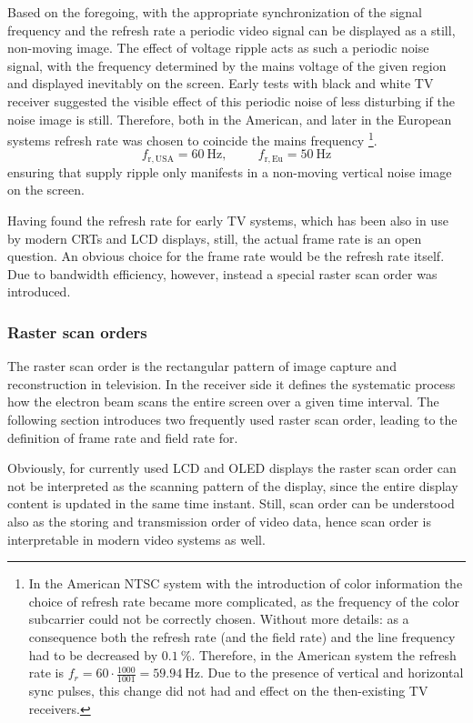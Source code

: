 %
Based on the foregoing, with the appropriate synchronization of the signal frequency and the refresh rate a periodic video signal can be displayed as a still, non-moving image.
The effect of voltage ripple acts as such a periodic noise signal, with the frequency determined by the mains voltage of the given region and displayed inevitably on the screen.
Early tests with black and white TV receiver suggested the visible effect of this periodic noise of less disturbing if the noise image is still.
Therefore, both in the American, and later in the European systems refresh rate was chosen to coincide the mains frequency
\footnote{
In the American NTSC system with the introduction of color information the choice of refresh rate became more complicated, as the frequency of the color subcarrier could not be correctly chosen.
Without more details: as a consequence both the refresh rate (and the field rate) and the line frequency had to be decreased by $0.1~\%$.
Therefore, in the American system the refresh rate is $f_r = 60\cdot \frac{1000}{1001} = 59.94~\mathrm{Hz}$.
Due to the presence of vertical and horizontal sync pulses, this change did not had and effect on the then-existing TV receivers.}.
\begin{equation}
f_{\mathrm{r,USA}} = 60~\mathrm{Hz}, \hspace{1cm} f_{\mathrm{r,Eu}} = 50~\mathrm{Hz}
\end{equation}
ensuring that supply ripple only manifests in a non-moving vertical noise image on the screen.

Having found the refresh rate for early TV systems, which has been also in use by modern CRTs and LCD displays, still, the actual frame rate is an open question.
An obvious choice for the frame rate would be the refresh rate itself.
Due to bandwidth efficiency, however, instead a special raster scan order was introduced. 

\subsubsection*{Raster scan orders}

The raster scan order is the rectangular pattern of image capture and reconstruction in television.
In the receiver side it defines the systematic process how the electron beam scans the entire screen over a given time interval.
The following section introduces two frequently used raster scan order, leading to the definition of frame rate and field rate for.

Obviously, for currently used LCD and OLED displays the raster scan order can not be interpreted as the scanning pattern of the display, since the entire display content is updated in the same time instant.
Still, scan order can be understood also as the storing and transmission order of video data, hence scan order is interpretable in modern video systems as well.

